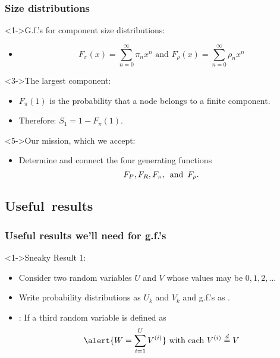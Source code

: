 \begin{frame}
  \frametitle{Size distributions}
  
  \begin{block}<1->{G.f.'s for component size distributions:}
    \begin{itemize}
    \item<2->
      $$ 
      F_{\pi}(x) = \sum_{n=0}^{\infty} \pi_n x^n 
      \mbox{\ and \ }
      F_{\rho}(x) = \sum_{n=0}^{\infty} \rho_n x^n $$
    \end{itemize}
  \end{block}

  \begin{block}<3->{The largest component:}
    \begin{itemize}
    \item<3->
       $F_\pi(1)$ is the probability
      that a node belongs to a \alert{finite} component.
    \item<4->
      Therefore: $S_1 = 1 - F_\pi(1)$.
    \end{itemize}
  \end{block}
  \begin{block}<5->{Our mission, which we accept:}
    \begin{itemize}
    \item<5->
      Determine and connect the four generating functions
      $$
      F_P,
      F_R,
      F_\pi,
      \mbox{\, and\, }
      F_\rho.
      $$
    \end{itemize}
  \end{block}
\end{frame}

\subsection{Useful\ results}

\begin{frame}[label=rn-sneakyresult1]
  \frametitle{Useful results we'll need for g.f.'s}
  
  \begin{block}<1->{Sneaky Result 1:}
    \begin{itemize}
    \item<2-> 
      Consider two random variables 
      \alert{$U$} and \alert{$V$} whose
      values may be $0,1,2,\ldots$
    \item<3-> 
      Write probability
      distributions as \alert{$U_k$ and $V_k$}
      and g.f.'s as .
    \item<4->
      : If a third random variable is defined as
      $$
      \alert{W = \sum_{i=1}^{U} V^{(i)}}
      \
      \mbox{with each}
      \
      V^{(i)}
      \stackrel{d}{=}
      V
      $$
    \end{itemize}
    
  \end{block}
\end{frame}

